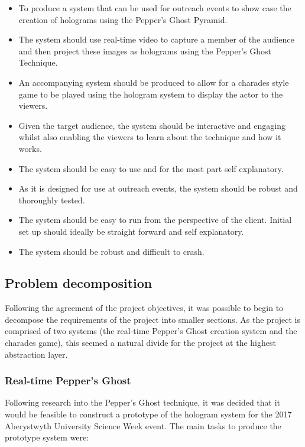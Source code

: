 \begin{itemize}
	\item To produce a system that can be used for outreach events to show case the creation of holograms using the Pepper's Ghost Pyramid.
	
	\item The system should use real-time video to capture a member of the audience and then project these images as holograms using the Pepper's Ghost Technique.
	
	\item An accompanying system should be produced to allow for a charades style game to be played using the hologram system to display the actor to the viewers.
	
	\item Given the target audience, the system should be interactive and engaging whilst also enabling the viewers to learn about the technique and how it works.
	
	\item The system should be easy to use and for the most part self explanatory.
	
	\item As it is designed for use at outreach events, the system should be robust and thoroughly tested.
	
	\item The system should be easy to run from the perspective of the client. Initial set up should ideally be straight forward and self explanatory.
	
	\item The system should be robust and difficult to crash.
\end{itemize}


\subsection{Problem decomposition}
Following the agreement of the project objectives, it was possible to begin to decompose the requirements of the project into smaller sections. As the project is comprised of two systems (the real-time Pepper's Ghost creation system and the charades game), this seemed a natural divide for the project at the highest abstraction layer.

\subsubsection{Real-time Pepper's Ghost}
Following research into the Pepper's Ghost technique, it was decided that it would be feasible to construct a prototype of the hologram system for the 2017 Aberystwyth University Science Week event. The main tasks to produce the prototype system were:

